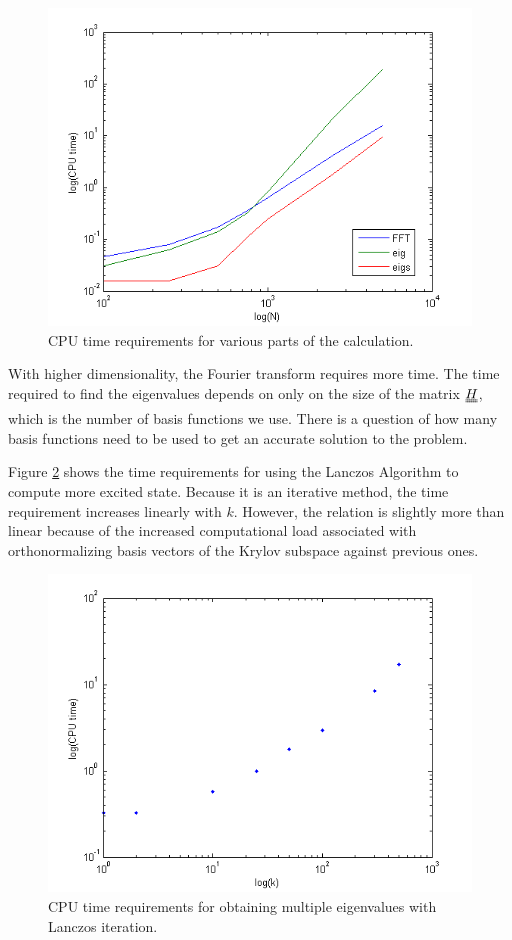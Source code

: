 \documentclass[12pt, a4paper, twocolumn]{article}
\begin{document}
\begin{figure}[h!]
  \centering
    \includegraphics[scale=0.5]{s1.png}
	\caption{CPU time requirements for various parts of the calculation.}
	\label{fig:s1}
\end{figure}

With higher dimensionality, the Fourier transform requires more time. The time required to find the eigenvalues depends on only on the size of the matrix $\uuline{H}$, which is the number of basis functions we use. There is a question of how many basis functions need to be used to get an accurate solution to the problem.

Figure \ref{fig:s2} shows the time requirements for using the Lanczos Algorithm to compute more excited state. Because it is an iterative method, the time requirement increases linearly with $k$. However, the relation is slightly more than linear because of the increased computational load associated with orthonormalizing basis vectors of the Krylov subspace against previous ones.

\begin{figure}[h!]
  \centering
    \includegraphics[scale=0.5]{s2.png}
	\caption{CPU time requirements for obtaining multiple eigenvalues with Lanczos iteration.}
	\label{fig:s2}
\end{figure}
\end{document}
